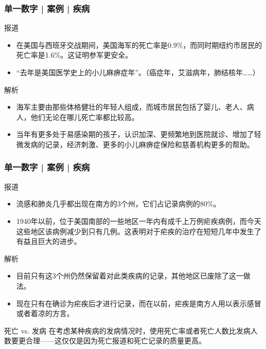 \begin{frame}
  \frametitle{单一数字 | 案例 | 疾病}
  \begin{block}{报道}
    \begin{itemize}
      \item 在美国与西班牙交战期间，美国海军的死亡率是0.9\%，而同时期纽约市居民的死亡率是1.6\%。这证明参军更安全。
      \item “去年是美国医学史上的小儿麻痹症年”。（癌症年，艾滋病年，肺结核年……）
    \end{itemize}
  \end{block}
  \pause \pause \pause \pause
  \begin{block}{解析}
    \begin{itemize}
      \item 海军主要由那些体格健壮的年轻人组成，而城市居民包括了婴儿、老人、病人，他们无论在哪儿死亡率都比较高。
      \item 当年有更多处于易感染期的孩子，认识加深、更频繁地到医院就诊、增加了轻微发病的记录，经济刺激、更多的小儿麻痹症保险和慈善机构更多的帮助。
    \end{itemize}
  \end{block}
\end{frame}

\begin{frame}
  \frametitle{单一数字 | 案例 | 疾病}
  \begin{block}{报道}
    \begin{itemize}
      \item 流感和肺炎几乎都出现在南方的3个州，它们占记录病例的80\%。
      \item 1940年以前，位于美国南部的一些地区一年内有成千上万例疟疾病例，而今天这些地区该病例减少到只有几例。这表明对于疟疾的治疗在短短几年中发生了有益且巨大的进步。
    \end{itemize}
  \end{block}
  \vspace{-0.4em}
  \pause \pause \pause \pause
  \begin{block}{解析}
    \begin{itemize}
      \item 目前只有这3个州仍然保留着对此类疾病的记录，其他地区已废除了这一做法。
      \item 现在只有在确诊为疟疾后才进行记录，而在以前，疟疾是南方人用以表示感冒或者着凉的方言。
    \end{itemize}
  \end{block}
  \vspace{-0.4em}
  \pause
  \begin{block}{死亡 vs. 发病}
    在考虑某种疾病的发病情况时，使用死亡率或者死亡人数比发病人数要更合理——这仅仅是因为死亡报道和死亡记录的质量更高。
  \end{block}
\end{frame}

